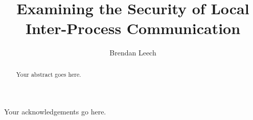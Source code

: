 \documentclass[midd]{thesis}
\title {Examining the Security of Local Inter-Process Communication}
\author {Brendan Leech}
\begin{document}
\maketitle
{}

\begin{abstract}
Your abstract goes here. 
\end{abstract}

\begin{acknowledgements}
Your acknowledgements go here.
\end{acknowledgements}

\contentspage
\tablelistpage   %
\figurelistpage

\normalspacing \setcounter{page}{1} 









\appendix






\end{document}
